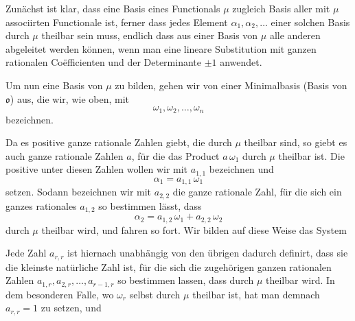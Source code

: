 
Zunächst ist klar, dass eine Basis eines Functionals $\mu$ zugleich Basis
aller mit $\mu$ associirten Functionale ist, ferner dass jedes Element
$\alpha_1, \alpha_2, \ldots$ einer solchen Basis durch $\mu$ theilbar sein
muss, endlich dass aus einer Basis von $\mu$ alle anderen abgeleitet werden
können, wenn man eine lineare Substitution mit ganzen rationalen
Co\"efficienten und der Determinante $\pm 1$ anwendet.

Um nun eine Basis von $\mu$ zu bilden, gehen wir von einer Minimalbasis
(Basis von $\mathfrak{o}$) aus, die wir, wie oben, mit
\[
\omega_1, \omega_2, \ldots, \omega_n
\]
bezeichnen.

Da es positive ganze rationale Zahlen giebt, die durch $\mu$ theilbar sind,
so giebt es auch ganze rationale Zahlen $a$, für die das Product
$a\,\omega_1$ durch $\mu$ theilbar ist. Die  positive unter diesen
Zahlen wollen wir mit $a_{1,1}$ bezeichnen und
\[
\alpha_1 = a_{1,1}\,\omega_1
\]
setzen. Sodann bezeichnen wir mit $a_{2,2}$ die  ganze
rationale Zahl, für die sich ein ganzes rationales $a_{1,2}$ so bestimmen
lässt, dass
\[
\alpha_2 = a_{1,2}\,\omega_1 + a_{2,2}\,\omega_2
\]
durch $\mu$ theilbar wird, und fahren so fort. Wir bilden auf diese Weise
das System

Jede Zahl $a_{r,r}$ ist hiernach unabhängig von den übrigen
dadurch definirt, dass sie die kleinste natürliche Zahl ist, für die sich
die zugehörigen ganzen rationalen Zahlen $a_{1,r}, a_{2,r}, \ldots,
a_{r-1,r}$ so bestimmen lassen, dass
durch $\mu$ theilbar wird. In dem besonderen Falle, wo
$\omega_r$ selbst durch $\mu$ theilbar ist, hat man demnach $a_{r,r} = 1$
zu setzen, und
